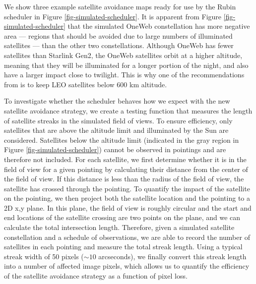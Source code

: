 \documentclass[twocolumn]{aastex631}
\begin{document}
\begin{figure*}[ht!]
\caption{Satellite avoidance maps constructed for the Rubin scheduler for each simulated constellation. Each is for a twilight observation period of 90 minutes (beginning after sunset with a Sun altitude of $-17.1$ degrees). The maps are rotated so zenith is in the center of the image. Darker regions have more illuminated satellites and therefore more negative weighting. By varying the weight placed on these maps, the scheduler will more actively avoid regions of the sky where satellites could streak images.
\label{fig-simulated-scheduler}
}
\end{figure*}

We show three example satellite avoidance maps ready for use by the Rubin scheduler in Figure \ref{fig-simulated-scheduler}. It is apparent from Figure \ref{fig-simulated-scheduler} that the simulated OneWeb constellation has more negative area --- regions that should be avoided due to large numbers of illuminated satellites --- than the other two constellations. Although OneWeb has fewer satellites than Starlink Gen2, the OneWeb satellites orbit at a higher altitude, meaning that they will be illuminated for a longer portion of the night, and also have a larger impact close to twilight. This is why one of the recommendations from \citet{satcon1} is to keep LEO satellites below 600 km altitude.

To investigate whether the scheduler behaves how we expect with the new satellite avoidance strategy, we create a testing function that measures the length of satellite streaks in the simulated field of views. To ensure efficiency, only satellites that are above the altitude limit and illuminated by the Sun are considered. Satellites below the altitude limit (indicated in the gray region in Figure \ref{fig-simulated-scheduler}) cannot be observed in pointings and are therefore not included. For each satellite, we first determine whether it is in the field of view for a given pointing by calculating their distance from the center of the field of view. If this distance is less than the radius of the field of view, the satellite has crossed through the pointing. To quantify the impact of the satellite on the pointing, we then project both the satellite location and the pointing to a 2D x,y plane. In this plane, the field of view is roughly circular and the start and end locations of the satellite crossing are two points on the plane, and we can calculate the total intersection length. Therefore, given a simulated satellite constellation and a schedule of observations, we are able to record the number of satellites in each pointing and measure the total streak length. Using a typical streak width of 50 pixels ($\sim10$ arcseconds), we finally convert this streak length into a number of affected image pixels, which allows us to quantify the efficiency of the satellite avoidance strategy as a function of pixel loss.
\end{document}
